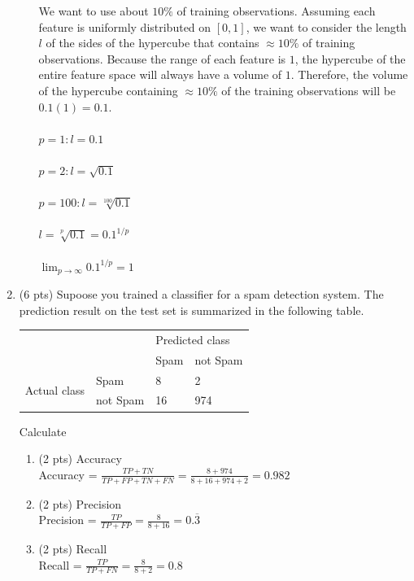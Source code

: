 \documentclass[a4paper]{article}
\theoremstyle{definition}
\newenvironment{soln}{
    \leavevmode\color{blue}\ignorespaces
}{}
\begin{document}
\begin{enumerate}
\begin{enumerate}
	\begin{soln}  We want to use about $10\%$ of training observations. Assuming each feature is uniformly distributed on $[0, 1]$, we want to consider the length $l$ of the sides of the hypercube that contains $\approx 10\%$ of training observations. Because the range of each feature is $1$, the hypercube of the entire feature space will always have a volume of $1$. Therefore, the volume of the hypercube containing $\approx10\%$ of the training observations will be $0.1(1) = 0.1$.
		\\ \\
		$p = 1: l = 0.1$
		\\ \\
		$p = 2: l =\sqrt{0.1}$
		\\ \\
		$p = 100: l = \sqrt[100]{0.1}$
		\\ \\
		$l = \sqrt[p]{0.1} = 0.1^{1/p}$
		\\ \\
		$\lim_{p \to \infty} 0.1^{1/p} = 1$
	\end{soln}
	
\end{enumerate}

\item (6 pts) Supoose you trained a classifier for a spam detection system. The prediction result on the test set is summarized in the following table.
\begin{center}
	\begin{tabular}{l l | l l}
		&          & \multicolumn{2}{l}{Predicted class} \\
		&          & Spam           & not Spam           \\
		\hline
		\multirow{2}{*}{Actual class} & Spam     & 8              & 2                  \\
		& not Spam & 16             & 974               
	\end{tabular}
\end{center}

Calculate
\begin{enumerate}
	\item (2 pts) Accuracy
	\begin{soln}  \\ Accuracy = $\frac{TP + TN}{TP + FP + TN + FN} = \frac{8 + 974}{8 + 16 + 974 + 2} = 0.982$ \end{soln}
	\item (2 pts) Precision
	\begin{soln}  \\ Precision = $\frac{TP}{TP + FP} = \frac{8}{8 + 16} = 0.\overline{3}$ \end{soln}
	\item (2 pts) Recall
	\begin{soln}  \\ Recall = $\frac{TP}{TP + FN} = \frac{8}{8 + 2} = 0.8$ \end{soln}
\end{enumerate}



\end{enumerate}
\end{document}

